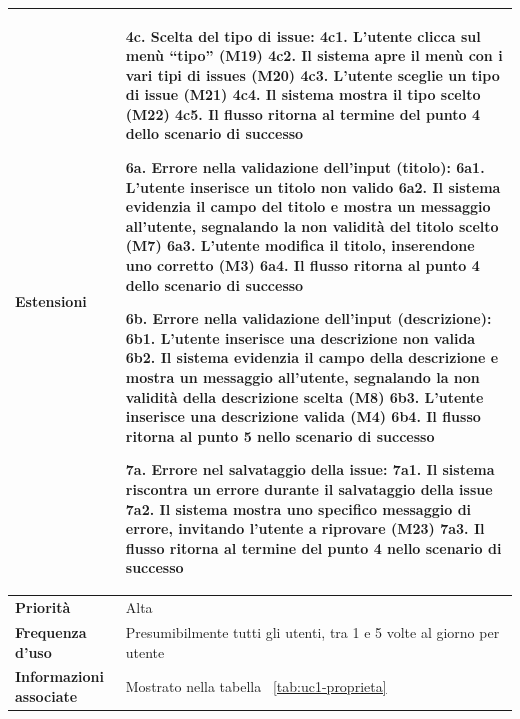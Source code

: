     \begin{longtable}{|p{4cm}|p{11cm}|}
    \hline
    \textbf{Estensioni} & 
    \textbf{4c. Scelta del tipo di issue:} \newline
    4c1. L'utente clicca sul menù “tipo” (M19) \newline
    4c2. Il sistema apre il menù con i vari tipi di issues (M20) \newline
    4c3. L'utente sceglie un tipo di issue (M21) \newline
    4c4. Il sistema mostra il tipo scelto (M22) \newline
    4c5. Il flusso ritorna al termine del punto 4 dello scenario di successo \newline

    \textbf{6a. Errore nella validazione dell'input (titolo):} \newline
    6a1. L'utente inserisce un titolo non valido \newline
    6a2. Il sistema evidenzia il campo del titolo e mostra un messaggio all'utente, segnalando la non validità del titolo scelto (M7) \newline
    6a3. L'utente modifica il titolo, inserendone uno corretto (M3) \newline
    6a4. Il flusso ritorna al punto 4 dello scenario di successo \newline

    \textbf{6b. Errore nella validazione dell'input (descrizione):} \newline
    6b1. L'utente inserisce una descrizione non valida \newline
    6b2. Il sistema evidenzia il campo della descrizione e mostra un messaggio all'utente, segnalando la non validità della descrizione scelta (M8) \newline
    6b3. L'utente inserisce una descrizione valida (M4) \newline
    6b4. Il flusso ritorna al punto 5 nello scenario di successo \newline

    \textbf{7a. Errore nel salvataggio della issue:} \newline
    7a1. Il sistema riscontra un errore durante il salvataggio della issue \newline
    7a2. Il sistema mostra uno specifico messaggio di errore, invitando l'utente a riprovare (M23) \newline
    7a3. Il flusso ritorna al termine del punto 4 nello scenario di successo \\
    \hline
    \textbf{Priorità} & Alta \\
    \hline
    \textbf{Frequenza d'uso} & Presumibilmente tutti gli utenti, tra 1 e 5 volte al giorno per utente \\
    \hline
    \textbf{Informazioni associate} & Mostrato nella tabella ~\ref{tab:uc1-proprieta} \\
    \hline
\end{longtable}

\newpage